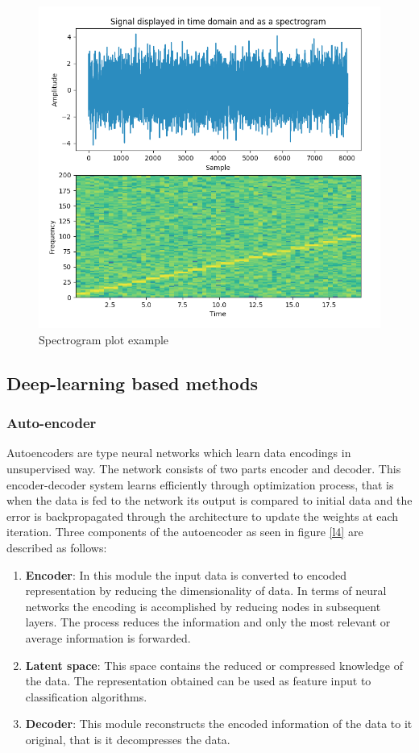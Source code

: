     \begin{figure}[h]
      	\centering
      	\includegraphics[width=0.5\linewidth]{images/spectrogram.png}
      	\caption{Spectrogram plot example \cite{spectrogram}}
      	\label{l3}
      \end{figure}
    
    
    

    \subsection{Deep-learning based methods }
    \subsubsection{Auto-encoder}
    Autoencoders are type neural networks which learn data encodings in unsupervised way. The network consists of two parts encoder and decoder. This encoder-decoder system learns efficiently through optimization process, that is when the data is fed to the network its output is compared to initial data and the error is backpropagated through the architecture to update the weights at each iteration. Three components of the autoencoder as seen in figure \ref{l4} are described as follows:
    \begin{enumerate}
    	\item \textbf{Encoder}: In this module the input data is converted to encoded representation by reducing the dimensionality of data. In terms of neural networks the encoding is accomplished by reducing nodes in subsequent layers.
    	The process reduces the information and only the most relevant or average information is forwarded.
    	\item \textbf{Latent space}: This space contains the reduced or compressed knowledge of the data. The representation obtained can be used as feature input to classification algorithms.
   	
    	\item \textbf{ Decoder}: This module reconstructs the encoded information of the data to it original, that is it decompresses the data.  
    \end{enumerate}
    
